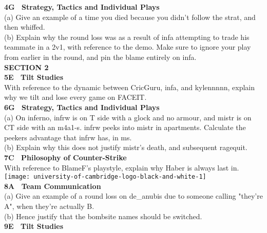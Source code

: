 \documentclass{article}
\begin{document}
\textbf{4G \ Strategy, Tactics and Individual Plays}
\vspace{5pt} \\ (a) Give an example of a time you died because you didn't follow the strat, and then whiffed.
\vspace{5pt} \\ (b) Explain why the round loss was as a result of infa attempting to trade his teammate in a 2v1, with reference to the demo. Make sure to ignore your play from earlier in the round, and pin the blame entirely on infa.
\vspace{15pt}
\\ \textbf{\large SECTION 2}
\vspace{5pt} \\
\textbf{5E \ Tilt Studies}
\vspace{5pt} \\ With reference to the dynamic between CricGuru, infa, and kylennnnn, explain why we tilt and lose every game on FACEIT.
\vspace{15pt} \\
\textbf{6G \ Strategy, Tactics and Individual Plays}
\vspace{5pt} \\ (a) On inferno, infrw is on T side with a glock and no armour, and mistr is on CT side with an m4a1-s. infrw peeks into mistr in apartments. Calculate the peekers advantage that infrw has, in ms.
\vspace{5pt} \\ (b) Explain why this does not justify mistr's death, and subsequent ragequit.
\vspace{15pt} \\
\textbf{7C \ Philosophy of Counter-Strike}
\vspace{5pt} \\ With reference to BlameF's playstyle, explain why Haber is always last in.
\newpage
\noindent\texttt{[image: university-of-cambridge-logo-black-and-white-1]}
\\\textbf{8A \ Team Communication}
\vspace{5pt} \\ (a) Give an example of a round loss on de\_anubis due to someone calling "they're A", when they're actually B.
\vspace{5pt} \\ (b) Hence justify that the bombsite names should be switched.
\vspace{15pt}\\ 
\textbf{9E \ Tilt Studies}
\end{document}
